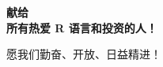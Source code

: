 \thispagestyle{empty}

\begin{center}  %
     \Large\bfseries 献给\\[2cm]  %
    所有热爱 R 语言和投资的人！ %
    \par  %
    愿我们勤奋、开放、日益精进！ %
\end{center}

\setlength{\abovedisplayskip}{-5pt}
\setlength{\abovedisplayshortskip}{-5pt}
